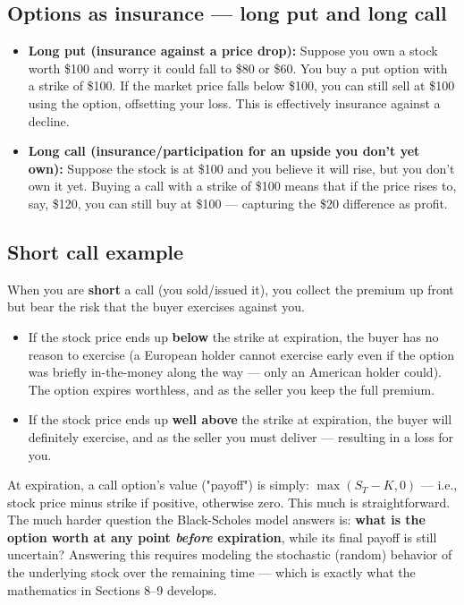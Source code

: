 \documentclass[12pt,openany]{book}
\theoremstyle{definition}
\theoremstyle{remark}
\begin{document}
\subsection{Options as insurance --- long put and long call}

\begin{itemize}
\item \textbf{Long put (insurance against a price drop):} Suppose you own a stock worth \$100 and worry it could fall to \$80 or \$60. You buy a put option with a strike of \$100. If the market price falls below \$100, you can still sell at \$100 using the option, offsetting your loss. This is effectively insurance against a decline.


\item \textbf{Long call (insurance/participation for an upside you don't yet own):} Suppose the stock is at \$100 and you believe it will rise, but you don't own it yet. Buying a call with a strike of \$100 means that if the price rises to, say, \$120, you can still buy at \$100 --- capturing the \$20 difference as profit.


\end{itemize}

\subsection{Short call example}

When you are \textbf{short} a call (you sold/issued it), you collect the premium up front but bear the risk that the buyer exercises against you.

\begin{itemize}
\item If the stock price ends up \textbf{below} the strike at expiration, the buyer has no reason to exercise (a European holder cannot exercise early even if the option was briefly in-the-money along the way --- only an American holder could). The option expires worthless, and as the seller you keep the full premium.


\item If the stock price ends up \textbf{well above} the strike at expiration, the buyer will definitely exercise, and as the seller you must deliver --- resulting in a loss for you.


\end{itemize}

At expiration, a call option's value ("payoff") is simply: \(\max(S_T-K,0)\) --- i.e., stock price minus strike if positive, otherwise zero. This much is straightforward. The much harder question the Black-Scholes model answers is: \textbf{what is the option worth at any point \emph{before} expiration}, while its final payoff is still uncertain? Answering this requires modeling the stochastic (random) behavior of the underlying stock over the remaining time --- which is exactly what the mathematics in Sections 8--9 develops.
\end{document}
